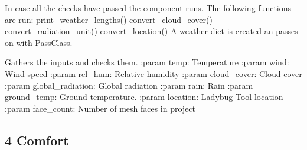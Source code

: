 \documentclass[letterpaper,10pt,english]{sphinxmanual}
\begin{document}
\begin{fulllineitems}
\begin{fulllineitems}
\label{\detokenize{cmf:livestock.components.comp_cmf.CMFWeather.run}}
In case all the checks have passed the component runs.
The following functions are run:
print\_weather\_lengths()
convert\_cloud\_cover()
convert\_radiation\_unit()
convert\_location()
A weather dict is created an passes on with PassClass.

\end{fulllineitems}


\begin{fulllineitems}
\label{\detokenize{cmf:livestock.components.comp_cmf.CMFWeather.run_checks}}
Gathers the inputs and checks them.
:param temp: Temperature
:param wind: Wind speed
:param rel\_hum: Relative humidity
:param cloud\_cover: Cloud cover
:param global\_radiation: Global radiation
:param rain: Rain
:param ground\_temp: Ground temperature.
:param location: Ladybug Tool location
:param face\_count: Number of mesh faces in project

\end{fulllineitems}


\end{fulllineitems}







\subsection{4 \textbar{} Comfort}
\label{\detokenize{comfort:module-livestock.components.comfort}}\label{\detokenize{comfort:id3}}\label{\detokenize{comfort::doc}}\label{\detokenize{comfort:comfort}}
\end{document}
